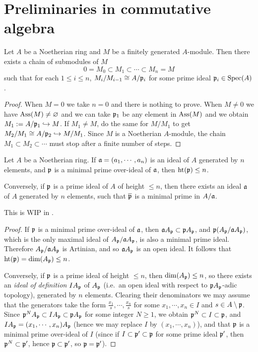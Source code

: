 \section{Preliminaries in commutative algebra}

\begin{prop}
\label{noeth-ring-filtration}
Let $A$ be a Noetherian ring and $M$ be a finitely generated $A$-module.
Then there exists a chain of submodules of $M$
\[0 = M_0 \subset M_1 \subset \cdots \subset M_n = M\]
such that for each $1\leq i\leq n$, $M_i/M_{i-1} \cong A/{\mathfrak{p}}_i$ for some prime ideal ${\mathfrak{p}}_i\in{\mathrm{Spec}}(A)$.
\end{prop}

\begin{proof}
When $M=0$ we take $n=0$ and there is nothing to prove.
When $M\neq 0$ we have $\operatorname{Ass}(M)\neq\varnothing$
and we can take ${\mathfrak{p}}_1$ be any element in $\operatorname{Ass}(M)$
and we obtain $M_1:=A/{\mathfrak{p}}_1\hookrightarrow M$.
If $M_1\neq M$, do the same for $M/M_1$ to get $M_2/M_1\cong A/{\mathfrak{p}}_2\hookrightarrow M/M_1$.
Since $M$ is a Noetherian $A$-module,
the chain $M_1\subset M_2\subset\cdots$ must stop after a finite number of steps.
\end{proof}

\begin{thm}
\label{krull-principal-ideal-thm}
Let $A$ be a Noetherian ring.
If ${\mathfrak{a}}=(a_1,\cdots,a_n)$ is an ideal of $A$ generated by $n$ elements,
and ${\mathfrak{p}}$ is a minimal prime over-ideal of ${\mathfrak{a}}$, then ${\mathrm{ht}}({\mathfrak{p}})\leq n$.

Conversely, if ${\mathfrak{p}}$ is a prime ideal of $A$ of height $\leq n$,
then there exists an ideal ${\mathfrak{a}}$ of $A$ generated by $n$ elements, such that
$\overline{{\mathfrak{p}}}$ is a minimal prime in $A/{\mathfrak{a}}$.
\end{thm}

This is WIP in .

\begin{proof}
If ${\mathfrak{p}}$ is a minimal prime over-ideal of ${\mathfrak{a}}$, then ${\mathfrak{a}} A_{\mathfrak{p}}\subset{\mathfrak{p}} A_{\mathfrak{p}}$,
and ${\mathfrak{p}}(A_{\mathfrak{p}}/{\mathfrak{a}} A_{\mathfrak{p}})$, which is the only maximal ideal of
$A_{\mathfrak{p}}/{\mathfrak{a}} A_{\mathfrak{p}}$, is also a minimal prime ideal.
Therefore $A_{\mathfrak{p}}/{\mathfrak{a}} A_{\mathfrak{p}}$ is Artinian, and so
${\mathfrak{a}} A_{\mathfrak{p}}$ is an open ideal. It follows that ${\mathrm{ht}}({\mathfrak{p}})=\dim(A_{\mathfrak{p}})\leq n$.

Conversely, if ${\mathfrak{p}}$ is a prime ideal of height $\leq n$,
then $\dim(A_{\mathfrak{p}})\leq n$, so there exists an \emph{ideal of definition}
$IA_{\mathfrak{p}}$ of $A_{\mathfrak{p}}$
(i.e.~an open ideal with respect to ${\mathfrak{p}} A_{\mathfrak{p}}$-adic topology),
generated by $n$ elements.
Clearing their denominators we may assume that the generators take the form
$\frac{x_1}s,\cdots,\frac{x_n}s$ for some $x_1,\cdots,x_n\in I$
and $s\in A\setminus{\mathfrak{p}}$.
Since ${\mathfrak{p}}^NA_{\mathfrak{p}}\subset IA_{\mathfrak{p}}\subset{\mathfrak{p}} A_{\mathfrak{p}}$ for some integer $N\geq 1$,
we obtain ${\mathfrak{p}}^N\subset I\subset{\mathfrak{p}}$, and
$IA_{\mathfrak{p}}=(x_1,\cdots,x_n)A_{\mathfrak{p}}$
(hence we may replace $I$ by $(x_1,\cdots,x_n)$), and that ${\mathfrak{p}}$ is a minimal prime over-ideal of $I$
(since if $I\subset{\mathfrak{p}}'\subset{\mathfrak{p}}$ for some prime ideal ${\mathfrak{p}}'$,
then ${\mathfrak{p}}^N\subset{\mathfrak{p}}'$, hence ${\mathfrak{p}}\subset{\mathfrak{p}}'$, so ${\mathfrak{p}}={\mathfrak{p}}'$).
\end{proof}

